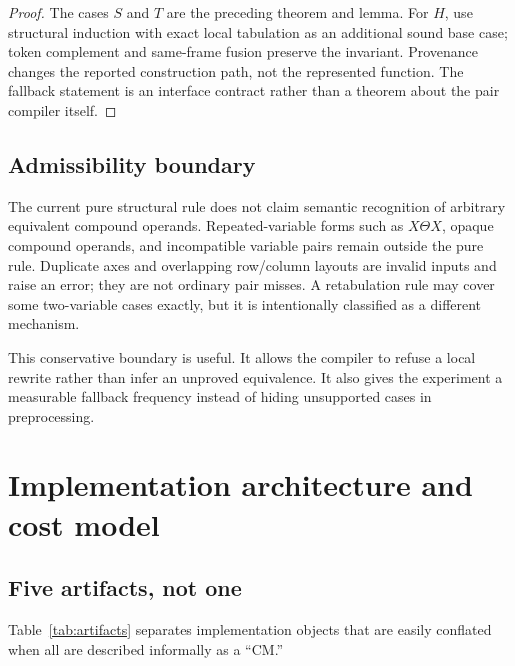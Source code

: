 \documentclass[10pt]{article}
\theoremstyle{plain}
\theoremstyle{definition}
\theoremstyle{remark}
\begin{document}
\begin{proof}
The cases $S$ and $T$ are the preceding theorem and lemma. For $H$, use structural induction with exact local tabulation as an additional sound base case; token complement and same-frame fusion preserve the invariant. Provenance changes the reported construction path, not the represented function. The fallback statement is an interface contract rather than a theorem about the pair compiler itself.
\end{proof}

\subsection{Admissibility boundary}

The current pure structural rule does not claim semantic recognition of arbitrary equivalent compound operands. Repeated-variable forms such as $X\Theta X$, opaque compound operands, and incompatible variable pairs remain outside the pure rule. Duplicate axes and overlapping row/column layouts are invalid inputs and raise an error; they are not ordinary pair misses. A retabulation rule may cover some two-variable cases exactly, but it is intentionally classified as a different mechanism.

This conservative boundary is useful. It allows the compiler to refuse a local rewrite rather than infer an unproved equivalence. It also gives the experiment a measurable fallback frequency instead of hiding unsupported cases in preprocessing.

\section{Implementation architecture and cost model}
\label{sec:implementation}

\subsection{Five artifacts, not one}

Table~\ref{tab:artifacts} separates implementation objects that are easily conflated when all are described informally as a ``CM.''
\end{document}
